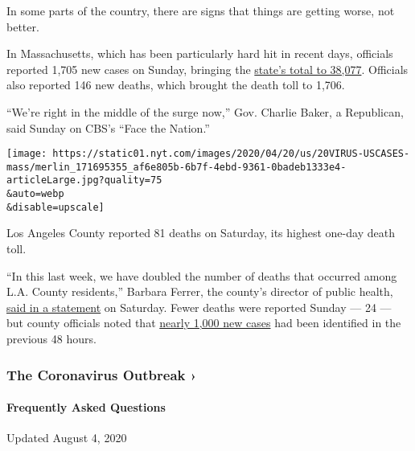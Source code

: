 In some parts of the country, there are signs that things are getting
worse, not better.

In Massachusetts, which has been particularly hard hit in recent days,
officials reported 1,705 new cases on Sunday, bringing the
\href{https://www.nytimes.com/interactive/2020/us/massachusetts-coronavirus-cases.html}{state's
total to 38,077}. Officials also reported 146 new deaths, which brought
the death toll to 1,706.

``We're right in the middle of the surge now,'' Gov. Charlie Baker, a
Republican, said Sunday on CBS's ``Face the Nation.''

\texttt{[image: https://static01.nyt.com/images/2020/04/20/us/20VIRUS-USCASES-mass/merlin\_171695355\_af6e805b-6b7f-4ebd-9361-0badeb1333e4-articleLarge.jpg?quality=75\\\&auto=webp\\\&disable=upscale]}

Los Angeles County reported 81 deaths on Saturday, its highest one-day
death toll.

``In this last week, we have doubled the number of deaths that occurred
among L.A. County residents,'' Barbara Ferrer, the county's director of
public health,
\href{http://publichealth.lacounty.gov/phcommon/public/media/mediapubhpdetail.cfm?prid=2325}{said
in a statement} on Saturday. Fewer deaths were reported Sunday --- 24
--- but county officials noted that
\href{http://publichealth.lacounty.gov/phcommon/public/media/mediapubhpdetail.cfm?prid=2326}{nearly
1,000 new cases} had been identified in the previous 48 hours.

\href{https://www.nytimes.com/news-event/coronavirus?action=click\&pgtype=Article\&state=default\&region=MAIN_CONTENT_3\&context=storylines_faq}{}

\hypertarget{the-coronavirus-outbreak-}{%
\subsubsection{The Coronavirus Outbreak
›}\label{the-coronavirus-outbreak-}}

\hypertarget{frequently-asked-questions}{%
\paragraph{Frequently Asked
Questions}\label{frequently-asked-questions}}

Updated August 4, 2020

